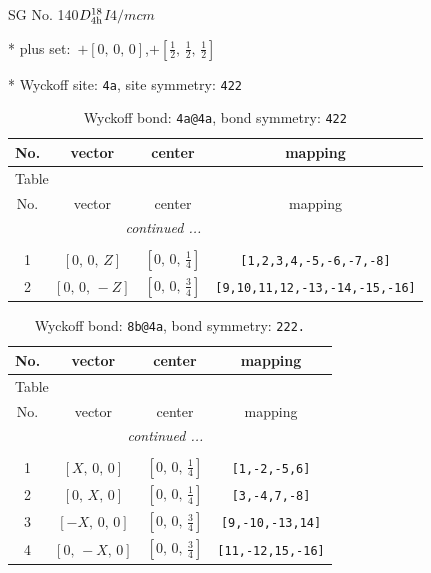 \documentclass[fleqn,8pt]{jsarticle}
\begin{document}
\setcounter{MaxMatrixCols}{32}

\renewcommand{\tablename}{Table~}
\renewcommand{\figurename}{Figure~}
\begin{center}
\LARGE
SG No. 140\quad$D_{\rm 4h}^{18}$\quad$I4/mcm$\quad[ tetragonal ]
\end{center}

* plus set:\,\,\,$+\left[ 0,\, 0,\, 0 \right]$,\quad $+\left[ \frac{1}{2},\, \frac{1}{2},\, \frac{1}{2} \right]$


* Wyckoff site: {\tt 4a}, site symmetry: {\tt 422}
\renewcommand{\arraystretch}{1.2}
\begin{longtable}{cccc}
\caption{Wyckoff bond: {\tt 4a@4a}, bond symmetry: {\tt 422}}
 \\
 \hline \hline
No. & vector & center & mapping \\ \hline \endfirsthead

\multicolumn{3}{l}{\tablename\ \thetable{}} \\
 \hline \hline
No. & vector & center & mapping \\ \hline \endhead

 \hline \hline
\multicolumn{3}{r}{\footnotesize\it continued ...} \\ \endfoot

 \hline \hline
\multicolumn{3}{r}{} \\ \endlastfoot

1 & $\left[ 0,\, 0,\, Z \right]$ & $\left[ 0,\, 0,\, \frac{1}{4} \right]$ & {\tt [1,2,3,4,-5,-6,-7,-8]} \\ \hline
2 & $\left[ 0,\, 0,\, - Z \right]$ & $\left[ 0,\, 0,\, \frac{3}{4} \right]$ & {\tt [9,10,11,12,-13,-14,-15,-16]} \\
\end{longtable}
\renewcommand{\arraystretch}{1.2}
\begin{longtable}{cccc}
\caption{Wyckoff bond: {\tt 8b@4a}, bond symmetry: {\tt 222.}}
 \\
 \hline \hline
No. & vector & center & mapping \\ \hline \endfirsthead

\multicolumn{3}{l}{\tablename\ \thetable{}} \\
 \hline \hline
No. & vector & center & mapping \\ \hline \endhead

 \hline \hline
\multicolumn{3}{r}{\footnotesize\it continued ...} \\ \endfoot

 \hline \hline
\multicolumn{3}{r}{} \\ \endlastfoot

1 & $\left[ X,\, 0,\, 0 \right]$ & $\left[ 0,\, 0,\, \frac{1}{4} \right]$ & {\tt [1,-2,-5,6]} \\ \hline
2 & $\left[ 0,\, X,\, 0 \right]$ & $\left[ 0,\, 0,\, \frac{1}{4} \right]$ & {\tt [3,-4,7,-8]} \\ \hline
3 & $\left[ - X,\, 0,\, 0 \right]$ & $\left[ 0,\, 0,\, \frac{3}{4} \right]$ & {\tt [9,-10,-13,14]} \\ \hline
4 & $\left[ 0,\, - X,\, 0 \right]$ & $\left[ 0,\, 0,\, \frac{3}{4} \right]$ & {\tt [11,-12,15,-16]} \\
\end{longtable}
\end{document}
